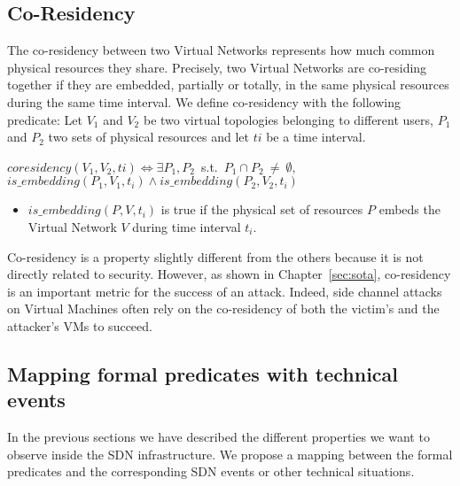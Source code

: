 \subsection{Co-Residency}
\label{sec:prop-cores}
The co-residency between two Virtual Networks represents how much common physical resources they share.
Precisely, two Virtual Networks are co-residing together if they are embedded, partially or totally, in the same physical resources during the same time interval.
We define co-residency with the following predicate:
Let $V_1$ and $V_2$ be two virtual topologies belonging to different users, $P_1$ and $P_2$ two sets of physical resources and let $ti$ be a time interval.
\begin{myformula}
$coresidency(V_1,V_2,ti) \Leftrightarrow \exists P_1,P_2$~s.t.~$P_1 \cap P_2~\neq~\emptyset, $\\ $is\_embedding(P_1,V_1,t_i) \wedge is\_embedding(P_2,V_2,t_i)$
\end{myformula}

\begin{itemize}
    \item $is\_embedding(P,V,t_i)$ is true if the physical set of resources $P$ embeds the Virtual Network $V$ during time interval $t_i$.
\end{itemize}

Co-residency is a property slightly different from the others because it is not directly related to security.
However, as shown in Chapter~\ref{sec:sota}, co-residency is an important metric for the success of an attack.
Indeed, side channel attacks on Virtual Machines often rely on the co-residency of both the victim's and the attacker's VMs to succeed.



\subsection{Mapping formal predicates with technical events}
\label{sec:mapping-model}
In the previous sections we have described the different properties we want to observe inside the SDN infrastructure.
We propose a mapping between the formal predicates and the corresponding SDN events or other technical situations.


